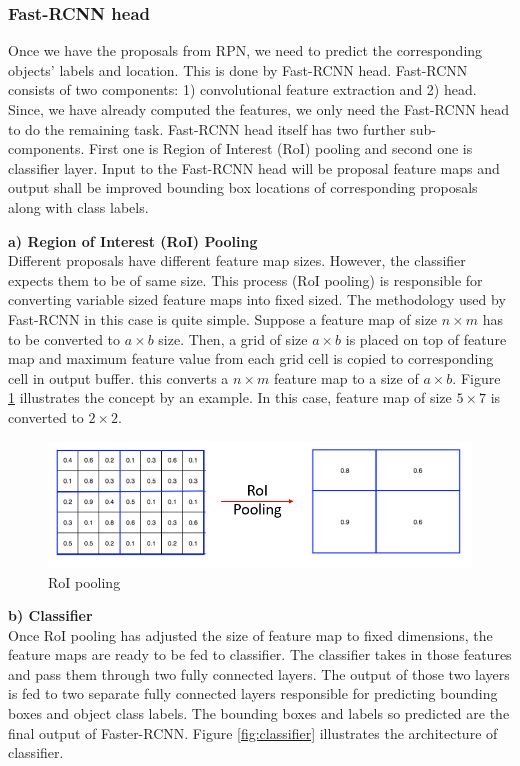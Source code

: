 \subsubsection{Fast-RCNN head}
Once we have the proposals from RPN, we need to predict the corresponding objects' labels and location. This is done by Fast-RCNN head. Fast-RCNN consists of two components: 1) convolutional feature extraction and  2) head. Since, we have already computed the features, we only need the Fast-RCNN head to do the remaining task. Fast-RCNN head itself has two further sub-components. First one is Region of Interest (RoI) pooling and second one is classifier layer. Input to the Fast-RCNN head will be proposal feature maps and output shall be improved bounding box locations of corresponding proposals along with class labels. 


\textbf{a) Region of Interest (RoI) Pooling} \\
Different proposals have different feature map sizes. However, the classifier expects them to be of same size. This process (RoI pooling) is responsible for converting variable sized feature maps into fixed sized. The methodology used by Fast-RCNN in this case is quite simple. Suppose a feature map of size $n\times m$ has to be converted to $a \times b$ size. Then, a grid of size $a \times b$ is placed on top of feature map and maximum feature value from each grid cell is copied to corresponding cell in output buffer. this converts a $n\times m$ feature map to a size of $a \times b$. Figure \ref{fig:roi-pooling} illustrates the concept by an example. In this case, feature map of size $5 \times 7$ is converted to $2 \times 2$.

\begin{figure}
    \centering
    \includegraphics[width=\linewidth]{images/roi-pooling.PNG}
    \caption{RoI pooling}
    \label{fig:roi-pooling}
\end{figure}

\textbf{b) Classifier} \\
Once RoI pooling has adjusted the size of feature map to fixed dimensions, the feature maps are ready to be fed to classifier. The classifier takes in those features and pass them through two fully connected layers. The output of those two layers is fed to two separate fully connected layers responsible for predicting bounding boxes and object class labels. The bounding boxes and labels so predicted are the final output of Faster-RCNN. Figure \ref{fig:classifier} illustrates the architecture of classifier.

